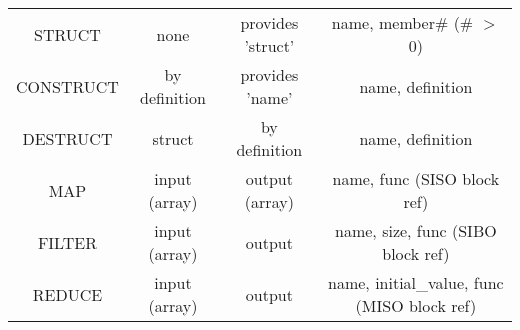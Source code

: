 \begin{longtable}[c]{ |c|c|c|c| }
    STRUCT & none & provides 'struct' & name, member\# (\# $>$ 0) \\
    CONSTRUCT & by definition & provides 'name' & name, definition \\
    DESTRUCT & struct & by definition & name, definition \\
    \hline
    MAP & input (array) & output (array) & name, func (SISO block ref) \\
    FILTER & input (array) & output & name, size, func (SIBO block ref) \\
    REDUCE & input (array) & output & name, initial\_value, func (MISO block ref) \\
    \hline
\end{longtable}
